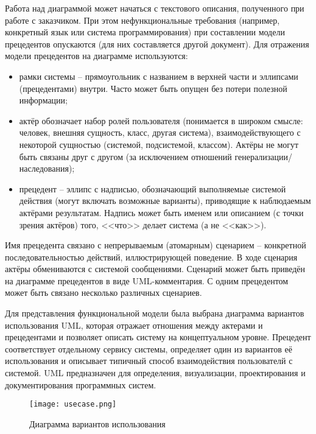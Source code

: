 Работа над диаграммой может начаться с текстового описания, полученного при работе с заказчиком. При этом нефункциональные требования (например, конкретный язык или система программирования) при составлении модели прецедентов опускаются (для них составляется другой документ).
Для отражения модели прецедентов на диаграмме используются:
\begin{itemize}
  \item рамки системы -- прямоугольник с названием в верхней части и эллипсами (прецедентами) внутри. Часто может быть опущен без потери полезной информации;
  \item актёр обозначает набор ролей пользователя (понимается в широком смысле: человек, внешняя сущность, класс, другая система), взаимодействующего с некоторой сущностью (системой, подсистемой, классом). Актёры не могут быть связаны друг с другом (за исключением отношений генерализации/наследования);
  \item  прецедент -- эллипс с надписью, обозначающий выполняемые системой действия (могут включать возможные варианты), приводящие к наблюдаемым актёрами результатам. Надпись может быть именем или описанием (с точки зрения актёров) того, <<что>> делает система (а не <<как>>).
\end{itemize}

Имя прецедента связано с непрерываемым (атомарным) сценарием -- конкретной последовательностью действий, иллюстрирующей поведение. В ходе сценария актёры обмениваются с системой сообщениями. Сценарий  может быть приведён на диаграмме прецедентов в виде UML-комментария. С одним прецедентом может быть связано несколько различных сценариев.

Для представления функциональной модели была выбрана диаграмма вариантов использования UML, которая отражает отношения между актерами и прецедентами и позволяет описать систему на концептуальном уровне. Прецедент соответствует отдельному сервису системы, определяет один из вариантов её использования и описывает типичный способ взаимодействия пользователй с системой. UML предназначен для определения, визуализации, проектирования и документирования программных систем.

\begin{figure}[ht]
\centering
  \texttt{[image: usecase.png]}  
  \caption{ Диаграмма вариантов использования }
  \label{fig:domain:manual_structure:credit_usecase}
\end{figure}

